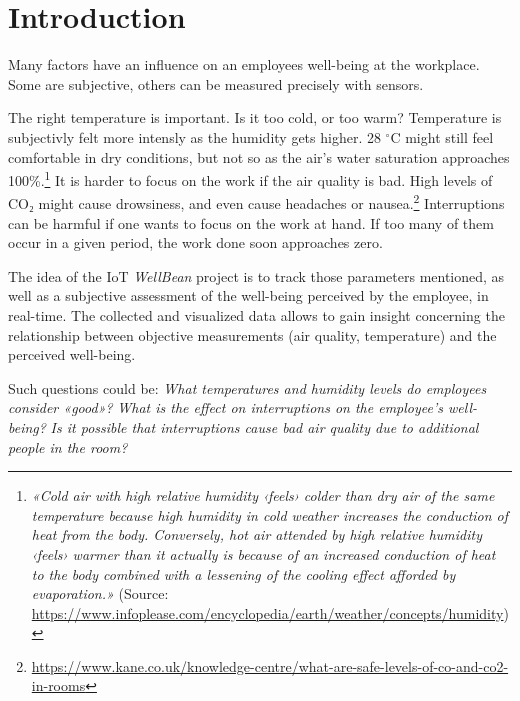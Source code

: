 \section{Introduction}

Many factors have an influence on an employees well-being at the workplace. Some are subjective, others can be measured precisely with sensors.

The right temperature is important. Is it too cold, or too warm? Temperature is subjectivly felt more intensly as the humidity gets higher. 28 $^{\circ}$C might still feel comfortable in dry conditions, but not so as the air's water saturation approaches 100\%.\footnote{\textit{«Cold air with high relative humidity ‹feels› colder than dry air of the same temperature because high humidity in cold weather increases the conduction of heat from the body. Conversely, hot air attended by high relative humidity ‹feels› warmer than it actually is because of an increased conduction of heat to the body combined with a lessening of the cooling effect afforded by evaporation.»} (Source: \url{https://www.infoplease.com/encyclopedia/earth/weather/concepts/humidity})} It is harder to focus on the work if the air quality is bad. High levels of CO₂ might cause drowsiness, and even cause headaches or nausea.\footnote{\url{https://www.kane.co.uk/knowledge-centre/what-are-safe-levels-of-co-and-co2-in-rooms}} Interruptions can be harmful if one wants to focus on the work at hand. If too many of them occur in a given period, the work done soon approaches zero.

The idea of the IoT \textit{WellBean} project is to track those parameters mentioned, as well as a subjective assessment of the well-being perceived by the employee, in real-time. The collected and visualized data allows to gain insight concerning the relationship between objective measurements (air quality, temperature) and the perceived well-being.

Such questions could be: \textit{What temperatures and humidity levels do employees consider «good»?} \textit{What is the effect on interruptions on the employee's well-being?} \textit{Is it possible that interruptions cause bad air quality due to additional people in the room?}
